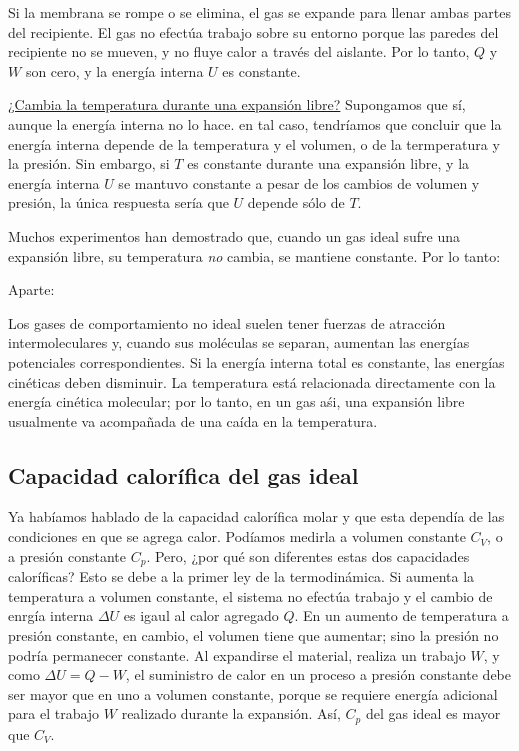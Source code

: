 \documentclass[12pt]{article}
\begin{document}
  Si la membrana se rompe o se elimina, el gas se expande para llenar ambas partes del recipiente. El gas no efectúa trabajo sobre su entorno porque las paredes del recipiente no se mueven, y no fluye calor a través del aislante. Por lo tanto, $ Q $ y $ W $ son cero, y la energía interna $ U $ es constante.

  \underline{¿Cambia la temperatura durante una expansión libre?} Supongamos que sí, aunque la energía interna no lo hace. en tal caso, tendríamos que concluir que la energía interna depende de la temperatura y el volumen, o de la termperatura y la presión. Sin embargo, si $ T $ es constante durante una expansión libre, y la energía interna $ U $ se mantuvo constante a pesar de los cambios de volumen y presión, la única respuesta sería que $ U $ depende sólo de $ T $. 

  Muchos experimentos han demostrado que, cuando un gas ideal sufre una expansión libre, su temperatura \textit{no} cambia, se mantiene constante. Por lo tanto:

  \vspace{0.2cm}

  Aparte:

  Los gases de comportamiento no ideal suelen tener fuerzas de atracción intermoleculares y, cuando sus moléculas se separan, aumentan las energías potenciales correspondientes. Si la energía interna total es constante, las energías cinéticas deben disminuir. La temperatura está relacionada directamente con la energía cinética molecular; por lo tanto, en un gas aśi, una expansión libre usualmente va acompañada de una caída en la temperatura.

  \subsection{Capacidad calorífica del gas ideal}
  Ya habíamos hablado de la capacidad calorífica molar y que esta dependía de las condiciones en que se agrega calor. Podíamos medirla a volumen constante $ C_{V} $, o a presión constante $ C_{p} $. Pero, ¿por qué son diferentes estas dos capacidades caloríficas? Esto se debe a la primer ley de la termodinámica. Si aumenta la temperatura a volumen constante, el sistema no efectúa trabajo y el cambio de enrgía interna $ \Delta U $ es igaul al calor agregado $ Q $. En un aumento de temperatura a presión constante, en cambio, el volumen tiene que aumentar; sino la presión no podría permanecer constante. Al expandirse el material, realiza un trabajo $ W $, y como $ \Delta U = Q - W $, el suministro de calor en un proceso a presión constante debe ser mayor que en uno a volumen constante, porque se requiere energía adicional para el trabajo $ W $ realizado durante la expansión. Así, $ C_{p} $ del gas ideal es mayor que $ C_{V} $.
\end{document}
